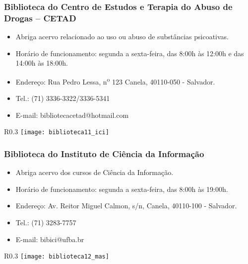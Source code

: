     \subsubsection{Biblioteca do Centro de Estudos e Terapia do Abuso de Drogas – CETAD}
        \begin{itemize}
            \item Abriga acervo relacionado ao uso ou abuso de substâncias psicoativas.
            \item Horário de funcionamento: segunda a sexta-feira, das 8:00h às 12:00h e das 14:00h às 18:00h.
            \item Endereço: Rua Pedro Lessa, n\textsuperscript{o} 123 Canela, 40110-050 - Salvador.
            \item Tel.: (71) 3336-3322/3336-5341
            \item E-mail: bibliotecacetad@hotmail.com
        \end{itemize}
        \begin{wrapfigure}{R}{0.3\textwidth}
            \centering
            \texttt{[image: biblioteca11\_ici]}
        \end{wrapfigure}
        \newpage
    \subsubsection{Biblioteca do Instituto de Ciência da Informação}
        \begin{itemize}
            \item Abriga acervo dos cursos de Ciência da Informação.
            \item Horário de funcionamento: segunda a sexta-feira, das 8:00h às 19:00h.
            \item Endereço: Av. Reitor Miguel Calmon, s/n, Canela, 40110-100 - Salvador.
            \item Tel.: (71) 3283-7757
            \item E-mail: bibici@ufba.br
        \end{itemize}
        \begin{wrapfigure}{R}{0.3\textwidth}
            \centering
            \texttt{[image: biblioteca12\_mas]}
        \end{wrapfigure}
